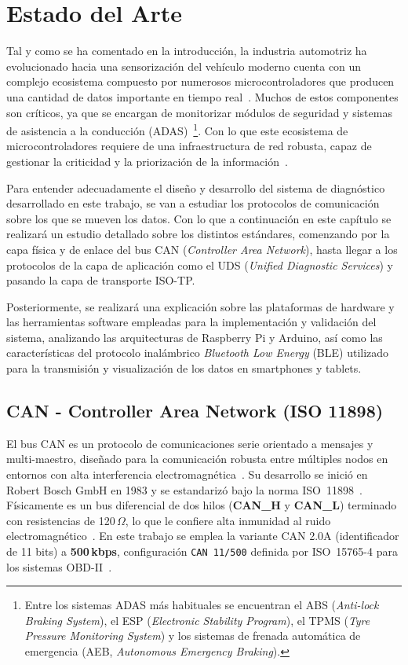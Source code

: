 \section{Estado del Arte}
\label{sec:protocolos}

Tal y como se ha comentado en la introducción, la industria automotriz ha evolucionado hacia una sensorización del vehículo moderno cuenta con un complejo ecosistema compuesto por numerosos microcontroladores que producen una cantidad de datos importante en tiempo real~\cite{CSSElec_OBD2, CiA_CANhistory}. Muchos de estos componentes son críticos, ya que se encargan de monitorizar módulos de seguridad y sistemas de asistencia a la conducción (ADAS)~\cite{CARB_OBDII}\footnote{Entre los sistemas ADAS más habituales se encuentran el ABS (\textit{Anti-lock Braking System}), el ESP (\textit{Electronic Stability Program}), el TPMS (\textit{Tyre Pressure Monitoring System}) y los sistemas de frenada automática de emergencia (AEB, \textit{Autonomous Emergency Braking}).}. Con lo que este ecosistema de microcontroladores requiere de una infraestructura de red robusta, capaz de gestionar la criticidad y la priorización de la información~\cite{ISO11898-1:2024}.

Para entender adecuadamente el diseño y desarrollo del sistema de diagnóstico desarrollado en este trabajo, se van a estudiar los protocolos de comunicación sobre los que se mueven los datos. Con lo que a continuación en este capítulo se realizará un estudio detallado sobre los distintos estándares, comenzando por la capa física y de enlace del bus CAN (\textit{Controller Area Network}), hasta llegar a los protocolos de la capa de aplicación como el UDS (\textit{Unified Diagnostic Services}) y pasando la capa de transporte ISO-TP.

Posteriormente, se realizará una explicación sobre las plataformas de hardware y las herramientas software empleadas para la implementación y validación del sistema, analizando las arquitecturas de Raspberry Pi y Arduino, así como las características del protocolo inalámbrico \textit{Bluetooth Low Energy} (BLE) utilizado para la transmisión y visualización de los datos en smartphones y tablets.

\subsection{CAN - Controller Area Network (ISO 11898)}
\label{sec:proto_can}

El bus CAN es un protocolo de comunicaciones serie orientado a mensajes y multi-maestro, diseñado para la comunicación robusta entre múltiples nodos en entornos con alta interferencia electromagnética~\cite{ISO11898-1:2024}. Su desarrollo se inició en Robert Bosch GmbH en 1983 y se estandarizó bajo la norma ISO~11898~\cite{ISO11898:1993, CiA_CANhistory}. Físicamente es un bus diferencial de dos hilos (\textbf{CAN\_H} y \textbf{CAN\_L}) terminado con resistencias de 120\,$\Omega$, lo que le confiere alta inmunidad al ruido electromagnético~\cite{ISO11898-2:2024}. En este trabajo se emplea la variante CAN 2.0A (identificador de 11 bits) a \textbf{500\,kbps}, configuración \texttt{CAN~11/500} definida por ISO~15765-4 para los sistemas OBD-II~\cite{ISO15765-4:2021}.

